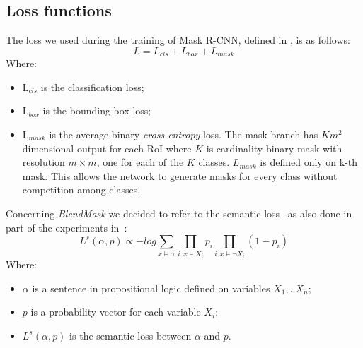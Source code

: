 \documentclass[10pt,twocolumn,letterpaper]{article}
\begin{document}
\subsection{Loss functions}
The loss we used during the training of Mask R-CNN, defined in \cite{Authors1_maskrcnn}, is as follows:
\begin{equation}
L = L_{cls} + L_{box} + L_{mask} 
\label{loss_mask}
\end{equation}
Where:
\begin{itemize}
\item L$_{cls}$ is the classification loss;
\item L$_{box}$ is the bounding-box loss;
\item  L$_{mask}$ is the average binary \textit{cross-entropy} loss. The mask branch has $Km^2$ dimensional output for each RoI where $K$ is cardinality binary mask with resolution $m \times m$, one for each of the $K$ classes. $L_{mask}$ is defined only on k-th mask. This allows the network to generate masks for every class without competition among classes.
\end{itemize}
\noindent
Concerning \textit{BlendMask} we decided to refer to the semantic loss~\cite{Authors8_semanticloss} as also done in part of the experiments in~\cite{Authors2_BlendMask}:
\begin{equation}
L^s(\alpha, p) \propto - log \sum_{x \models \alpha} \prod_{i:x \models X_i} p_i \prod_{i:x \models \neg X_i} (1-p_i)
\label{Loss_semantic}
\end{equation}
Where:
\begin{itemize}
\item $\alpha$ is a sentence in propositional logic defined on variables $X_1,..X_n$;
\item $p$ is a probability vector for each variable $X_i$;
\item $L^s(\alpha, p)$ is the semantic loss between $\alpha$ and $p$.
\end{itemize}
\end{document}
